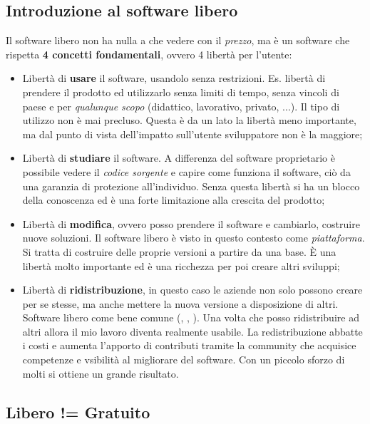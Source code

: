 \subsection{Introduzione al software libero}

Il software libero non ha nulla a che vedere con il \textit{prezzo}, ma è un software che rispetta \textbf{4 concetti fondamentali}, ovvero 4 libertà per l'utente:

\begin{itemize}

\item Libertà di \textbf{usare} il software, usandolo senza restrizioni. Es. libertà di prendere il prodotto ed utilizzarlo senza limiti di tempo, senza vincoli di paese e per \textit{qualunque scopo} (didattico, lavorativo, privato, ...). Il tipo di utilizzo non è mai precluso. Questa è da un lato la libertà meno importante, ma dal punto di vista dell'impatto sull'utente sviluppatore non è la maggiore;
\item Libertà di \textbf{studiare} il software. A differenza del software proprietario è possibile vedere il \textit{codice sorgente} e capire come funziona il software, ciò da una garanzia di protezione all'individuo. Senza questa libertà si ha un blocco della conoscenza ed è una forte limitazione alla crescita del prodotto;
\item Libertà di \textbf{modifica}, ovvero posso prendere il software e cambiarlo, costruire nuove soluzioni. Il software libero è visto in questo contesto come \textit{piattaforma}. Si tratta di costruire delle proprie versioni a partire da una base. È una libertà molto importante ed è una ricchezza per poi creare altri sviluppi;
\item Libertà di \textbf{ridistribuzione}, in questo caso le aziende non solo possono creare per se stesse, ma anche mettere la nuova versione a disposizione di altri. Software libero come bene comune (, , ). Una volta che posso ridistribuire ad altri allora il mio lavoro diventa realmente usabile. La redistribuzione abbatte i costi e aumenta l'apporto di contributi tramite la community che acquisice competenze e vsibilità al migliorare del software. Con un piccolo sforzo di molti si ottiene un grande risultato.

\end{itemize}

\subsection{Libero != Gratuito}

